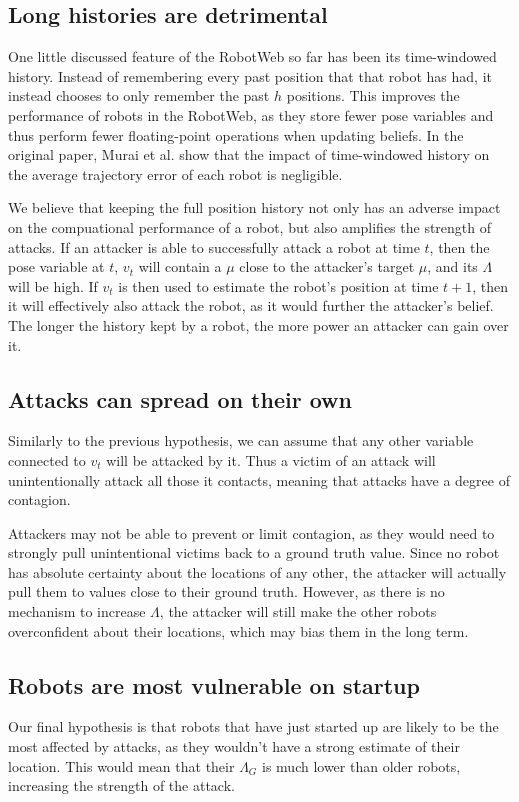 \subsection{Long histories are detrimental} %
One little discussed feature of the RobotWeb so far has been its time-windowed history. Instead of remembering every past position that that robot has had, it instead chooses to only remember the past $h$ positions. This improves the performance of robots in the RobotWeb, as they store fewer pose variables and thus perform fewer floating-point operations when updating beliefs. In the original paper, Murai et al. show that the impact of time-windowed history on the average trajectory error of each robot is negligible.


We believe that keeping the full position history not only has an adverse impact on the compuational performance of a robot, but also amplifies the strength of attacks. If an attacker is able to successfully attack a robot at time $t$, then the pose variable at $t$, $v_t$ will contain a $\mu$ close to the attacker's target $\mu$, and its $\Lambda$ will be high. If $v_t$ is then used to estimate the robot's position at time $t+1$, then it will effectively also attack the robot, as it would further the attacker's belief. The longer the history kept by a robot, the more power an attacker can gain over it.

\subsection{Attacks can spread on their own} %
Similarly to the previous hypothesis, we can assume that any other variable connected to $v_t$ will be attacked by it. Thus a victim of an attack will unintentionally attack all those it contacts, meaning that attacks have a degree of contagion. 

Attackers may not be able to prevent or limit contagion, as they would need to strongly pull unintentional victims back to a ground truth value. Since no robot has absolute certainty about the locations of any other, the attacker will actually pull them to values close to their ground truth. However, as there is no mechanism to increase $\Lambda$, the attacker will still make the other robots overconfident about their locations, which may bias them in the long term.
\subsection{Robots are most vulnerable on startup}
Our final hypothesis is that robots that have just started up are likely to be the most affected by attacks, as they wouldn't have a strong estimate of their location. This would mean that their $\Lambda_G$ is much lower than older robots, increasing the strength of the attack.

